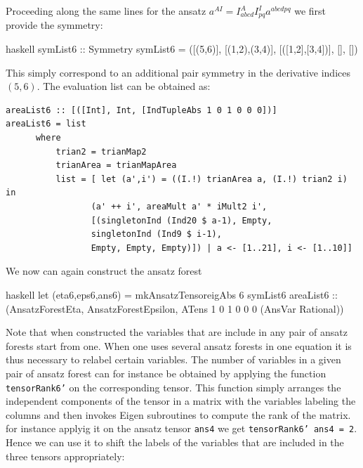 \documentclass[a4paper,12pt, DIV=14, BCOR=5mm, twoside, headsepline]{scrbook}
\begin{document}
Proceeding along the same lines for the ansatz $a^{AI} = I^A _{abcd} I^I_{pq} a^{abcdpq}$ we first provide the symmetry:

\begin{center}
\begin{cminted}{haskell}
symList6 :: Symmetry
symList6 = ([(5,6)], [(1,2),(3,4)], [([1,2],[3,4])], [], [])
\end{cminted}
\end{center}

This simply correspond to an additional pair symmetry in the derivative indices $(5,6)$. The evaluation list can be obtained as:

\begin{samepage}
\begin{verbatim}
areaList6 :: [([Int], Int, [IndTupleAbs 1 0 1 0 0 0])]
areaList6 = list
      where
          trian2 = trianMap2
          trianArea = trianMapArea
          list = [ let (a',i') = ((I.!) trianArea a, (I.!) trian2 i) in
                 (a' ++ i', areaMult a' * iMult2 i', 
                 [(singletonInd (Ind20 $ a-1), Empty,
                 singletonInd (Ind9 $ i-1),
                 Empty, Empty, Empty)]) | a <- [1..21], i <- [1..10]]
\end{verbatim} 
\end{samepage}

We now can again construct the ansatz forest 

\begin{center}
\begin{cminted}{haskell}
let (eta6,eps6,ans6) = mkAnsatzTensoreigAbs 6 symList6 areaList6 :: 
                       (AnsatzForestEta, AnsatzForestEpsilon,
                       ATens 1 0 1 0 0 0 (AnsVar Rational))
\end{cminted}
\end{center}

Note that when constructed the variables that are include in any pair of ansatz forests start from one. When one uses several ansatz forests in one equation it is thus necessary to relabel certain variables. The number of variables in a given pair of ansatz forest can for instance be obtained by applying the function \texttt{tensorRank6'} on the corresponding tensor. This function simply arranges the independent components of the tensor in a matrix with the variables labeling the columns and then invokes Eigen subroutines to compute the rank of the matrix. for instance applyig it on the ansatz tensor \texttt{ans4} we get \texttt{tensorRank6' ans4 = 2}. Hence we can use it to shift the labels of the variables that are included in the three tensors appropriately:
\end{document}
